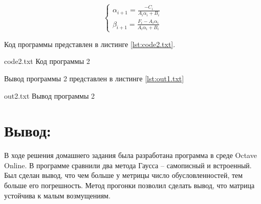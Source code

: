 \documentclass{bmstu}
\begin{document}
\begin{equation*}
 \begin{cases}
     \alpha_{i+1} = \frac{-C_i}{A_i \alpha_i + B_i} \\
     \beta_{i+1} = \frac{F_i - A_i \alpha_i}{A_i \alpha_i + B_i} 
 \end{cases}
\end{equation*}

Код программы представлен в листинге \ref{lst:code2.txt}.

    {code2.txt}
    {Код программы 2}

Вывод программы 2 представлен в листинге \ref{lst:out1.txt}

    {out2.txt}
    {Вывод программы 2}

\section*{Вывод:}
	В ходе решения домашнего задания была разработана программа в среде Octave Online. В программе сравнили два метода Гаусса -- самописный и встроенный. Был сделан вывод, что чем больше у метрицы число обусловленностей, тем больше его погрешность. Метод прогонки позволил сделать вывод, что матрица устойчива к малым возмущениям.
\end{document}
